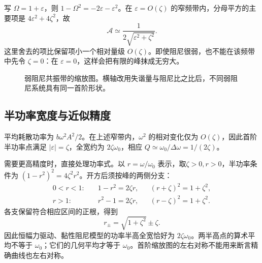 \documentclass[11pt,openany,fontset=fandol]{ctexbook}
\theoremstyle{plain}\newtheorem{theorem}{定理}[chapter]\newtheorem{proposition}[theorem]{命题}
\theoremstyle{definition}\newtheorem{definition}{定义}[chapter]\newtheorem{example}{例}[chapter]
\theoremstyle{remark}\newtheorem*{remark}{说明}
\begin{document}
写 $\Omega=1+\varepsilon$，则 $1-\Omega^2=-2\varepsilon-\varepsilon^2$。在 $\varepsilon=O(\zeta)$ 的窄频带内，分母平方的主要项是 $4\varepsilon^2+4\zeta^2$，故
\begin{equation}\label{eq:near-resonance}
\mathcal A\simeq\frac1{2\sqrt{\varepsilon^2+\zeta^2}}.
\end{equation}
这里舍去的项比保留项小一个相对量级 $O(\zeta)$。即使阻尼很弱，也不能在该频带中先令 $\zeta=0$：在 $\varepsilon=0$，这样会把有限的峰抹成无穷大。

\begin{figure}[htbp]\centering
{}
\caption{弱阻尼共振带的缩放图。横轴改用失谐量与阻尼比之比后，不同弱阻尼系统具有同一首阶形状。}
\label{fig:orig-007}
\end{figure}

\subsection{半功率宽度与近似精度}
平均耗散功率为 $b\omega^2A^2/2$。在上述窄带内，$\omega^2$ 的相对变化仅为 $O(\zeta)$，因此首阶半功率点满足 $|\varepsilon|=\zeta$，全宽约为 $2\zeta\omega_0$，相应 $Q\simeq\omega_0/\Delta\omega=1/(2\zeta)$。

需要更高精度时，直接处理功率式。以 $r=\omega/\omega_0$ 表示，取$\zeta>0,r>0$，半功率条件为
$(1-r^2)^2=4\zeta^2r^2$。开方后须按峰的两侧分支：
\[
\begin{aligned}
0<r<1:&\quad 1-r^2=2\zeta r,
&& (r+\zeta)^2=1+\zeta^2,\\
r>1:&\quad r^2-1=2\zeta r,
&& (r-\zeta)^2=1+\zeta^2.
\end{aligned}
\]
各支保留符合相应区间的正根，得到
\[
r_\pm=\sqrt{1+\zeta^2}\pm\zeta.
\]
因此恒幅力驱动、黏性阻尼模型的功率半高全宽恰好为 $2\zeta\omega_0$。两半高点的算术平均不等于 $\omega_0$；它们的几何平均才等于 $\omega_0$。首阶缩放图的左右对称不能用来断言精确曲线也左右对称。
\end{document}

